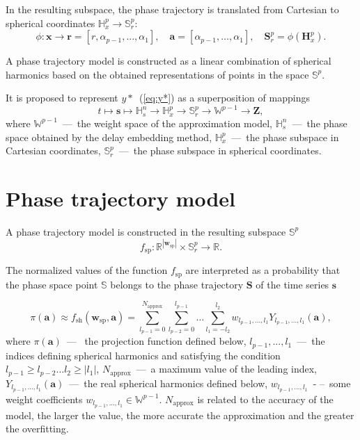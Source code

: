 \documentclass[12pt,twoside]{article}
\begin{document}
In the resulting subspace, the phase trajectory is translated from Cartesian to spherical coordinates $\mathbb{H}_{x}^{p} \xrightarrow{} \mathbb{S}_{r}^{p}$:
\[
    \phi: \mathbf{x} \xrightarrow{} \mathbf{r} = [r,\alpha_{p-1},\dots,\alpha_1],
    \quad
    \mathbf{a} = [\alpha_{p-1},\dots,\alpha_1],
    \quad
    \mathbf{S}_{r}^{p} = \phi(\mathbf{H}_{x}^{p}).
\]

A phase trajectory model is constructed as a linear combination of spherical harmonics based on the obtained representations of points in the space $\mathbb{S}^{p}$.

It is proposed to represent $y*$~(\ref{eq:y*}) as a superposition of mappings
\begin{equation*}
t \mapsto \mathbf{s} \mapsto \mathbb{H}_{s}^{n} \xrightarrow{} \mathbb{H}_{x}^{p} \xrightarrow{} \mathbb{S}_r^{p} \xrightarrow{} \mathbb{W}^{p-1} \xrightarrow{} \mathbf{Z},
\label{tikhonov_eq_pipeline}
\end{equation*}
where $\mathbb{W}^{p-1}$~---~the weight space of the approximation model, $\mathbb{H}_{s}^{n}$~---~the phase space obtained by the delay embedding method, $\mathbb{H}_{x}^{p}$~---~the phase subspace in Cartesian coordinates, $\mathbb{S}_{r}^{p}$~---~the phase subspace in spherical coordinates.
\section{Phase trajectory model}
A phase trajectory model is constructed in the resulting subspace $\mathbb{S}^{p}$
\begin{equation}
    f_{\text{sp}}: \mathbb{R}^{|\mathbf{w}_{\text{sp}}|} \times \mathbb{S}_{r}^{p}
    \xrightarrow{}
    \mathbb{R}.
\label{eq:f_sp}
\end{equation}

The normalized values of the function $f_{\text{sp}}$ are interpreted as a probability that the phase space point $\mathbb{S}$ belongs to the phase trajectory $\mathbf{S}$ of the time series $\mathbf{s}$

\begin{equation}
	\pi(\mathbf{a}) \approx
	f_{\text{sh}}(\mathbf{w}_{\text{sp}},\mathbf{a}) =
	\sum_{l_{p-1} = 0}^{N_{\text{approx}}}
	\sum_{l_{p-2} = 0}^{l_{p-1}}
	\dots
	\sum_{l_1 = -l_2}^{l_2}
	w_{l_{p-1},...,l_1} Y_{l_{p-1},...,l_1}(\mathbf{a}),
\label{eq:f_sh}
\end{equation}
where $\pi(\mathbf{a})$~---~ the projection function defined below, $l_{p-1},...,l_1$~---~the indices defining spherical harmonics and satisfying the condition $l_{p-1} \geq l_{p-2} \dots l_2 \geq|l_1|$, $N_{\text{approx}}$~---~a maximum value of the leading index, $Y_{l_{ p-1},...,l_1}(\mathbf{a})$~---~the real spherical harmonics defined below, $w_{l_{p-1},...,l_1}$~- --~some weight coefficients $w_{l_{p-1},...,l_1} \in \mathbb{W}^{p-1}$.
$N_{\text{approx}}$ is related to the accuracy of the model, the larger the value, the more accurate the approximation and the greater the overfitting.
 
\end{document}
